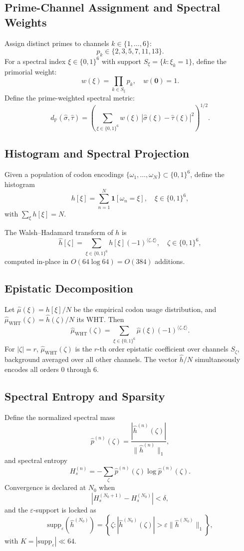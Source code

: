 \documentclass[11pt]{article}
\begin{document}
\subsection{Prime-Channel Assignment and Spectral Weights}

Assign distinct primes to channels $k \in \{1,\dots,6\}$:
\[
  p_k \in \{2,3,5,7,11,13\}.
\]
For a spectral index $\xi \in \{0,1\}^6$ with support
$S_\xi = \{k : \xi_k = 1\}$, define the primorial weight:
\[
  w(\xi) = \prod_{k \in S_\xi} p_k, \quad w(\mathbf{0}) = 1.
\]
Define the prime-weighted spectral metric:
\[
  d_{\mathbb{P}}(\hat{\sigma}, \hat{\tau}) =
  \left( \sum_{\xi \in \{0,1\}^6}
    w(\xi)\,|\hat{\sigma}(\xi) - \hat{\tau}(\xi)|^2
  \right)^{1/2}.
\]

\subsection{Histogram and Spectral Projection}

Given a population of codon encodings
$\{\omega_1,\dots,\omega_N\} \subset \{0,1\}^6$,
define the histogram
\[
  h[\xi] = \sum_{n=1}^N \mathbf{1}[\omega_n = \xi], \quad \xi \in \{0,1\}^6,
\]
with $\sum_\xi h[\xi] = N$.

The Walsh--Hadamard transform of $h$ is
\[
  \hat{h}[\zeta] =
  \sum_{\xi \in \{0,1\}^6} h[\xi] (-1)^{\langle \zeta, \xi \rangle},
  \quad \zeta \in \{0,1\}^6,
\]
computed in-place in $O(64 \log 64) = O(384)$ additions.

\subsection{Epistatic Decomposition}

Let $\hat{\mu}(\xi) = h[\xi]/N$ be the empirical codon usage distribution,
and $\hat{\mu}_{\text{WHT}}(\zeta) = \hat{h}(\zeta)/N$ its WHT.
Then
\[
  \hat{\mu}_{\text{WHT}}(\zeta)
  = \sum_{\xi \in \{0,1\}^6} \hat{\mu}(\xi) (-1)^{\langle \zeta, \xi \rangle}.
\]
For $|\zeta| = r$, $\hat{\mu}_{\text{WHT}}(\zeta)$ is the $r$-th order
epistatic coefficient over channels $S_\zeta$, background averaged over
all other channels. The vector $\hat{h}/N$ simultaneously encodes
all orders $0$ through $6$.

\subsection{Spectral Entropy and Sparsity}

Define the normalized spectral mass
\[
  \hat{p}^{(n)}(\zeta) =
  \frac{|\hat{h}^{(n)}(\zeta)|}{\|\hat{h}^{(n)}\|_1},
\]
and spectral entropy
\[
  H_s^{(n)} = -\sum_\zeta \hat{p}^{(n)}(\zeta)
  \log \hat{p}^{(n)}(\zeta).
\]
Convergence is declared at $N_0$ when
\[
  |H_s^{(N_0+1)} - H_s^{(N_0)}| < \delta,
\]
and the $\varepsilon$-support is locked as
\[
  \text{supp}_\varepsilon(\hat{h}^{(N_0)}) =
  \left\{
    \zeta : |\hat{h}^{(N_0)}(\zeta)| >
    \varepsilon \|\hat{h}^{(N_0)}\|_1
  \right\},
\]
with $K = |\text{supp}_\varepsilon| \ll 64$.
\end{document}

